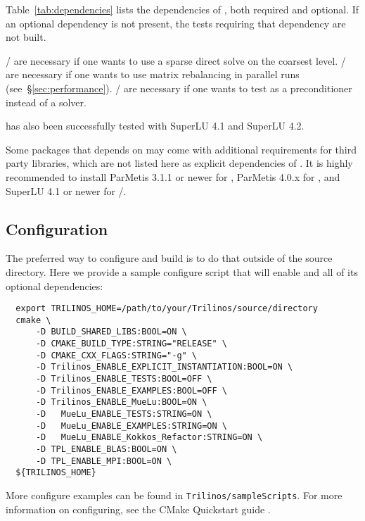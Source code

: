Table~\ref{tab:dependencies} lists the dependencies of \muelu, both required and
optional. If an optional dependency is not present, the tests requiring that
dependency are not built.

\begin{mycomment}
\amesos{}/\amesostwo{} are necessary if one wants to use a sparse direct solve on the coarsest level.
\zoltan{}/\zoltantwo{} are necessary if one wants to use matrix rebalancing in parallel runs (see~\S\ref{sec:performance}).
\aztecoo{}/\belos{} are necessary if one wants to test \muelu{} as a preconditioner instead of a solver.
\end{mycomment}

\begin{mycomment}
\muelu{} has also been successfully tested with SuperLU 4.1 and SuperLU 4.2.
\end{mycomment}
\begin{mycomment}
Some packages that \muelu{} depends on may come with additional requirements for
third party libraries, which are not listed here as explicit dependencies of \muelu{}.
It is highly recommended to install ParMetis 3.1.1 or newer for \zoltan{},
ParMetis 4.0.x for \zoltantwo{}, and SuperLU 4.1 or newer for
\amesos{}/\amesostwo{}.
\end{mycomment}

\subsection{Configuration}
The preferred way to configure and build \muelu{} is to do that outside of the source directory.
Here we provide a sample configure script that will enable \muelu{} and all of its optional dependencies:
\begin{lstlisting}
  export TRILINOS_HOME=/path/to/your/Trilinos/source/directory
  cmake \
      -D BUILD_SHARED_LIBS:BOOL=ON \
      -D CMAKE_BUILD_TYPE:STRING="RELEASE" \
      -D CMAKE_CXX_FLAGS:STRING="-g" \
      -D Trilinos_ENABLE_EXPLICIT_INSTANTIATION:BOOL=ON \
      -D Trilinos_ENABLE_TESTS:BOOL=OFF \
      -D Trilinos_ENABLE_EXAMPLES:BOOL=OFF \
      -D Trilinos_ENABLE_MueLu:BOOL=ON \
      -D   MueLu_ENABLE_TESTS:STRING=ON \
      -D   MueLu_ENABLE_EXAMPLES:STRING=ON \
      -D   MueLu_ENABLE_Kokkos_Refactor:STRING=ON \
      -D TPL_ENABLE_BLAS:BOOL=ON \
      -D TPL_ENABLE_MPI:BOOL=ON \
  ${TRILINOS_HOME}
\end{lstlisting}

\noindent
More configure examples can be found in \texttt{Trilinos/sampleScripts}.
For more information on configuring, see the \trilinos CMake Quickstart guide \cite{TrilinosCmakeQuickStart}.

